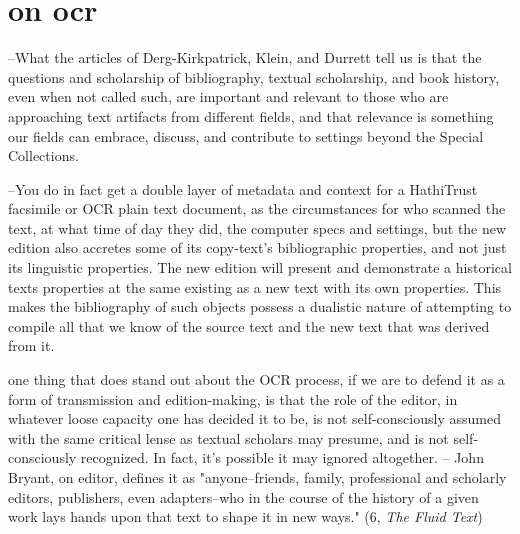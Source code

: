 \documentclass[course, english]{Notes}
\newcommand{\n}{\scalebox{2}{\textbf{\framebox{$\aleph$} } } }
\begin{document}
\section{on ocr}
\n --What the articles of Derg-Kirkpatrick, Klein, and Durrett tell us is that the questions and scholarship of bibliography, textual scholarship, and book history, even when not called such, are important and relevant to those who are approaching text artifacts from different fields, and that relevance is something our fields can embrace, discuss, and contribute to settings beyond the Special Collections. 

\n --You do in fact get a double layer of metadata and context for a HathiTrust facsimile or OCR plain text document, as the circumstances for who scanned the text, at what time of day they did, the computer specs and settings, but the new edition also accretes some of its copy-text's bibliographic properties, and not just its linguistic properties. The new edition will present and demonstrate a historical texts properties at the same existing as a new text with its own properties. This makes the bibliography of such objects possess a dualistic nature of attempting to compile all that we know of the source text and the new text that was derived from it.

\n one thing that does stand out about the OCR process, if we are to defend it as a form of transmission and edition-making, is that the role of the editor, in whatever loose capacity one has decided it to be, is not self-consciously assumed with the same critical lense as textual scholars may presume, and is not self-consciously recognized. In fact, it's possible it may ignored altogether.
	-- John Bryant, on editor, defines it as "anyone--friends, family, professional and scholarly editors, publishers, even adapters--who in the course of the history of a given work lays hands upon that text to shape it in new ways." (6, \textit{The Fluid Text}) 
\end{document}
